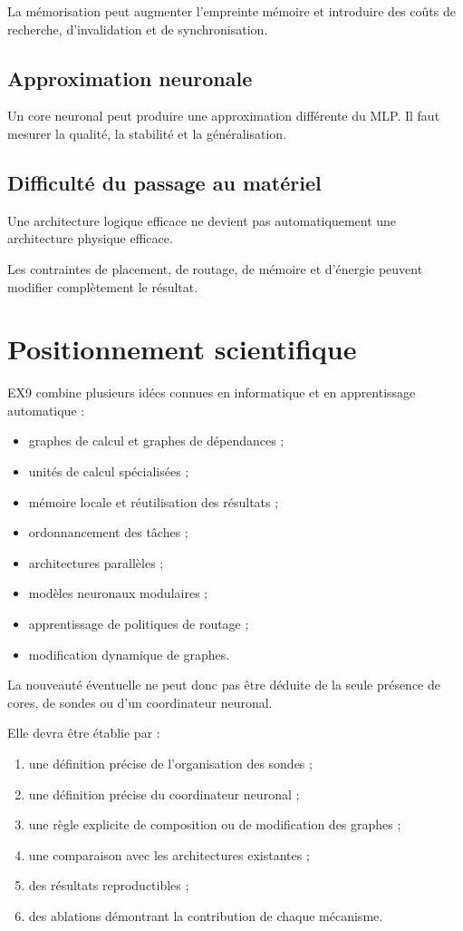 \documentclass[11pt,a4paper]{article}
\begin{document}
La mémorisation peut augmenter l'empreinte mémoire et introduire
des coûts de recherche, d'invalidation et de synchronisation.

\subsection{Approximation neuronale}

Un core neuronal peut produire une approximation différente du MLP.
Il faut mesurer la qualité, la stabilité et la généralisation.

\subsection{Difficulté du passage au matériel}

Une architecture logique efficace ne devient pas automatiquement
une architecture physique efficace.

Les contraintes de placement, de routage, de mémoire et d'énergie
peuvent modifier complètement le résultat.

\section{Positionnement scientifique}

EX9 combine plusieurs idées connues en informatique et en
apprentissage automatique :
\begin{itemize}
  \item graphes de calcul et graphes de dépendances ;
  \item unités de calcul spécialisées ;
  \item mémoire locale et réutilisation des résultats ;
  \item ordonnancement des tâches ;
  \item architectures parallèles ;
  \item modèles neuronaux modulaires ;
  \item apprentissage de politiques de routage ;
  \item modification dynamique de graphes.
\end{itemize}

La nouveauté éventuelle ne peut donc pas être déduite de la seule
présence de cores, de sondes ou d'un coordinateur neuronal.

Elle devra être établie par :
\begin{enumerate}
  \item une définition précise de l'organisation des sondes ;
  \item une définition précise du coordinateur neuronal ;
  \item une règle explicite de composition ou de modification
        des graphes ;
  \item une comparaison avec les architectures existantes ;
  \item des résultats reproductibles ;
  \item des ablations démontrant la contribution de chaque mécanisme.
\end{enumerate}
\end{document}
